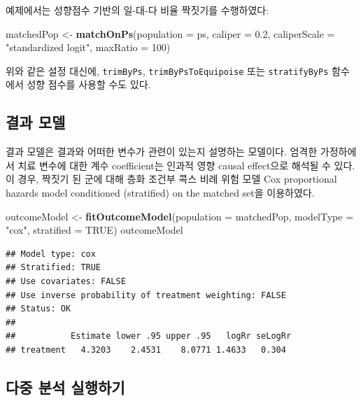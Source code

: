 \documentclass[10.5pt]{book}
\newenvironment{Shaded}{\begin{snugshade}}{\end{snugshade}}
\newcommand{\KeywordTok}[1]{\textcolor[rgb]{0.13,0.29,0.53}{\textbf{#1}}}
\newcommand{\DataTypeTok}[1]{\textcolor[rgb]{0.13,0.29,0.53}{#1}}
\newcommand{\DecValTok}[1]{\textcolor[rgb]{0.00,0.00,0.81}{#1}}
\newcommand{\FloatTok}[1]{\textcolor[rgb]{0.00,0.00,0.81}{#1}}
\newcommand{\StringTok}[1]{\textcolor[rgb]{0.31,0.60,0.02}{#1}}
\newcommand{\OtherTok}[1]{\textcolor[rgb]{0.56,0.35,0.01}{#1}}
\newcommand{\NormalTok}[1]{#1}
\theoremstyle{definition}
\theoremstyle{definition}
\theoremstyle{definition}
\theoremstyle{remark}
\begin{document}
예제에서는 성향점수 기반의 일-대-다 비율 짝짓기를 수행하였다:

\begin{Shaded}
\begin{Highlighting}[]
\NormalTok{matchedPop <-}\StringTok{ }\KeywordTok{matchOnPs}\NormalTok{(}\DataTypeTok{population =}\NormalTok{ ps, }\DataTypeTok{caliper =} \FloatTok{0.2}\NormalTok{,}
                        \DataTypeTok{caliperScale =} \StringTok{"standardized logit"}\NormalTok{, }\DataTypeTok{maxRatio =} \DecValTok{100}\NormalTok{)}
\end{Highlighting}
\end{Shaded}

위와 같은 설정 대신에, \texttt{trimByPs}, \texttt{trimByPsToEquipoise}
또는 \texttt{stratifyByPs} 함수에서 성향 점수를 사용할 수도 있다.

\subsection{결과 모델}\label{-}

결과 모델은 결과와 어떠한 변수가 관련이 있는지 설명하는 모델이다. 엄격한
가정하에서 치료 변수에 대한 계수 coefficient는 인과적 영향 causal
effect으로 해석될 수 있다. 이 경우, 짝짓기 된 군에 대해 층화 조건부 콕스
비례 위험 모델 Cox proportional hazards model conditioned (stratified)
on the matched set을 이용하였다.

\begin{Shaded}
\begin{Highlighting}[]
\NormalTok{outcomeModel <-}\StringTok{ }\KeywordTok{fitOutcomeModel}\NormalTok{(}\DataTypeTok{population =}\NormalTok{ matchedPop,}
                                \DataTypeTok{modelType =} \StringTok{"cox"}\NormalTok{,}
                                \DataTypeTok{stratified =} \OtherTok{TRUE}\NormalTok{)}
\NormalTok{outcomeModel}
\end{Highlighting}
\end{Shaded}

\begin{verbatim}
## Model type: cox
## Stratified: TRUE
## Use covariates: FALSE
## Use inverse probability of treatment weighting: FALSE
## Status: OK
## 
##           Estimate lower .95 upper .95   logRr seLogRr
## treatment   4.3203    2.4531    8.0771 1.4633   0.304
\end{verbatim}

\subsection{다중 분석 실행하기}\label{MultipleAnalyses}
\end{document}
